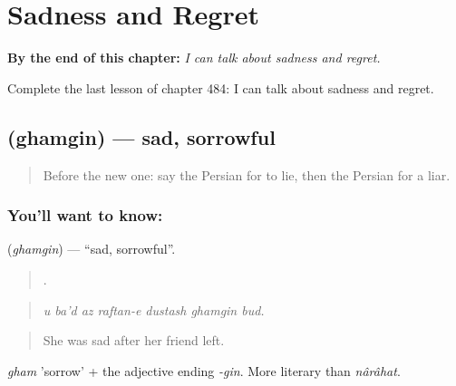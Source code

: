 
\chapter{Sadness and Regret}
\label{ch:fa-sadness-and-regret}

\begin{chapteropening}
\textbf{By the end of this chapter:} \emph{I can talk about sadness and regret.}

Complete the last lesson of chapter 484: I can talk about sadness and regret.
\end{chapteropening}

\section[\texorpdfstring{\fa{غمگین} (ghamgin)}{غمگین (ghamgin)}]{ (ghamgin) — sad, sorrowful}

\label{lesson:FA-C484-ghamgin}



\begin{quote}
Before the new one: say the Persian for to lie, then the Persian for a liar.
\end{quote}

\subsection*{You'll want to know: }
\textbf{} (\emph{ghamgin}) — \textquotedblleft{}sad, sorrowful\textquotedblright{}.

\begin{quote}
      .
\end{quote}

\begin{quote}
\emph{u ba'd az raftan-e dustash ghamgin bud.}
\end{quote}

\begin{quote}
She was sad after her friend left.
\end{quote}

\emph{gham} 'sorrow' + the adjective ending \emph{-gin}. More literary than \emph{nârâhat}.


